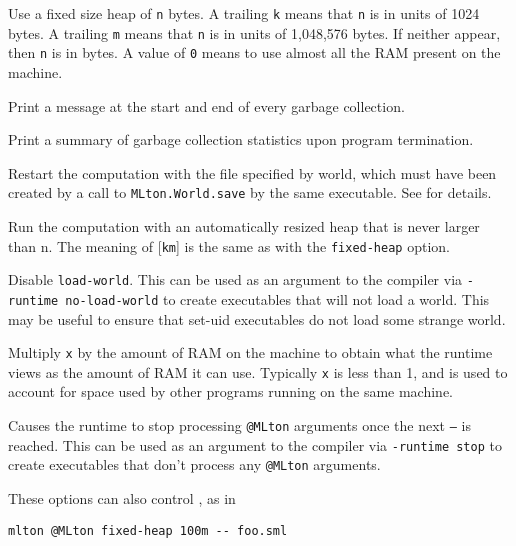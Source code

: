 \begin{description}
 Use a fixed size heap of {\tt n} bytes.
 A trailing {\tt k} means that {\tt n} is in units of 1024 bytes. 
 A trailing {\tt m} means that {\tt n} is in units of 1,048,576 bytes. 
 If neither appear, then {\tt n} is in bytes.
 A value of {\tt 0} means to use almost all the RAM present on the
 machine.

Print a message at the start and end of every garbage collection.

Print a summary of garbage collection statistics upon program
termination.

Restart the computation with the file specified by world, which must
have been created by a call to {\tt MLton.World.save} by the same
executable.  See  for details.

Run the computation with an automatically resized heap that is never
larger than n.  The meaning of [{\tt km}] is the same as with the
{\tt fixed-heap} option.

Disable {\tt load-world}.  This can be used as an argument to the
compiler via {\tt -runtime no-load-world} to create executables that
will not load a world.  This may be useful to ensure that set-uid
executables do not load some strange world.

Multiply {\tt x} by the amount of RAM on the machine to obtain what
the runtime views as the amount of RAM it can use.  Typically {\tt x}
is less than 1, and is used to account for space used by other
programs running on the same machine.

Causes the runtime to stop processing {\tt @MLton} arguments once the
next {\tt --} is reached.  This can be used as an argument to the
compiler via {\tt -runtime stop} to create executables that don't
process any {\tt @MLton} arguments.
\end{description}
These options can also control {\mlton}, as in
\begin{verbatim}
mlton @MLton fixed-heap 100m -- foo.sml
\end{verbatim}
